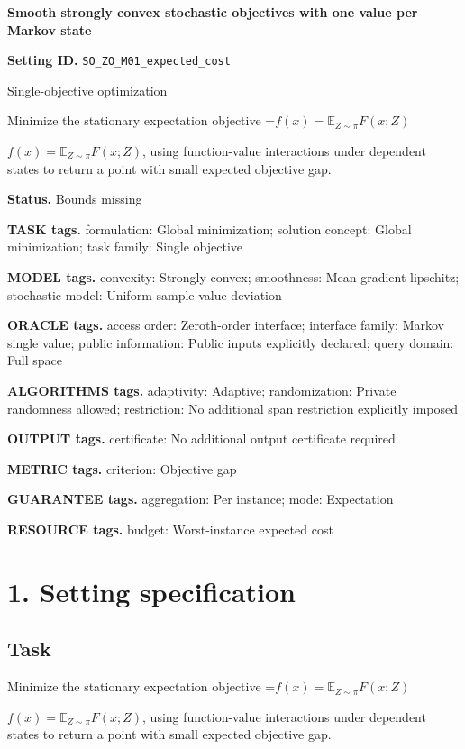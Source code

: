 \documentclass[10pt,a4paper]{article}
\newcommand{\AtlasMath}[1]{\par\begingroup\centering\setbox0=\hbox{$\displaystyle #1$}\ifdim\wd0>1.4\linewidth\typeout{ATLAS WIDE FORMULA: \the\wd0}\fi\ifdim\wd0>\linewidth\resizebox{\linewidth}{!}{\box0}\else\box0\fi\par\endgroup}
\newcommand{\AtlasInlineMath}[1]{\begingroup\setbox0=\hbox{$#1$}\ifdim\wd0>.4\linewidth\endgroup\AtlasMath{#1}\else\endgroup$#1$\fi}
\begin{document}
\raggedright

{\LARGE\bfseries\sffamily\color{AtlasNavy} Smooth strongly convex stochastic objectives with one value per Markov state\par}\vspace{5pt}
\textbf{Setting ID.} \texttt{SO\_\allowbreak{}ZO\_\allowbreak{}M01\_\allowbreak{}expected\_\allowbreak{}cost}

Single-objective optimization

Minimize the stationary expectation objective \AtlasInlineMath{f(x)=\mathbb{E}_{Z\sim\pi}F(x;Z)}, using function-value interactions under dependent states to return a point with small expected objective gap.

\textbf{Status.} Bounds missing

\textbf{TASK tags.} formulation: Global minimization; solution concept: Global minimization; task family: Single objective

\textbf{MODEL tags.} convexity: Strongly convex; smoothness: Mean gradient lipschitz; stochastic model: Uniform sample value deviation

\textbf{ORACLE tags.} access order: Zeroth-order interface; interface family: Markov single value; public information: Public inputs explicitly declared; query domain: Full space

\textbf{ALGORITHMS tags.} adaptivity: Adaptive; randomization: Private randomness allowed; restriction: No additional span restriction explicitly imposed

\textbf{OUTPUT tags.} certificate: No additional output certificate required

\textbf{METRIC tags.} criterion: Objective gap

\textbf{GUARANTEE tags.} aggregation: Per instance; mode: Expectation

\textbf{RESOURCE tags.} budget: Worst-instance expected cost

\section{1. Setting specification}
\subsection{Task}
Minimize the stationary expectation objective \AtlasInlineMath{f(x)=\mathbb{E}_{Z\sim\pi}F(x;Z)}, using function-value interactions under dependent states to return a point with small expected objective gap.
\end{document}
